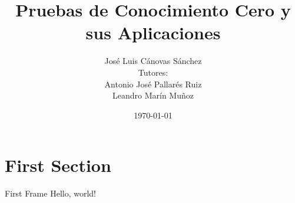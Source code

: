 \documentclass{beamer}
\title{Pruebas de Conocimiento Cero y sus Aplicaciones}
\date{\today}
\author{José Luis Cánovas Sánchez\\[3mm]\scriptsize Tutores:\\Antonio José Pallarés Ruiz\\Leandro Marín Muñoz}
\institute{Universidad de Murcia\\Facultad de Matemáticas}
\begin{document}
\maketitle

\section{First Section}
\begin{frame}{First Frame}
	Hello, world!
\end{frame}
\end{document}

